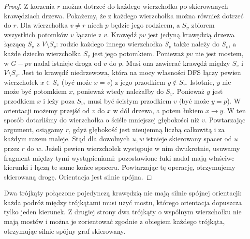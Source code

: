 \begin{proof}
Z korzenia $r$ można dotrzeć do każdego wierzchołka
po skierowanych krawędziach drzewa. Pokażemy, że
z każdego wierzchołka można również dotrzeć do $r$.
Dla wierzchołka $v\ne r$ niech $p$ będzie jego rodzicem,
a $S_v$ zbiorem wszystkich potomków $v$ łącznie z $v$.
Krawędź $pv$ jest jedyną krawędzią drzewa łączącą
$S_v$ z $V\setminus S_v$: rodzic każdego innego
wierzchołka $S_v$ także należy do $S_v$, a każde
dziecko wierzchołka $S_v$ jest jego potomkiem.
Ponieważ $pv$ nie jest mostem, w $G-pv$ nadal istnieje
droga od $v$ do $p$. Musi ona zawierać krawędź między
$S_v$ i $V\setminus S_v$. Jest to krawędź niedrzewowa,
która na mocy własności DFS łączy pewien wierzchołek
$x\in S_v$ (być może $x=v$) z jego przodkiem
$y\notin S_v$. Istotnie, $y$ nie może być potomkiem
$x$, ponieważ wtedy należałby do $S_v$. Ponieważ
$y$ jest przodkiem $x$ i leży poza $S_v$, musi być
ścisłym przodkiem $v$ (być może $y=p$).
W orientacji możemy przejść od $v$ do $x$ w dół drzewa,
a potem łukiem $x\to y$. W ten sposób dotarliśmy do
wierzchołka o ściśle mniejszej głębokości niż $v$.
Powtarzając argument, osiągamy $r$, gdyż głębokość
jest nieujemną liczbą całkowitą i za każdym razem maleje.
Stąd dla dowolnych $u,w$ istnieje skierowany spacer
od $u$ przez $r$ do $w$. Jeżeli pewien wierzchołek
występuje w nim dwukrotnie, usuwamy fragment między
tymi wystąpieniami: pozostawione łuki nadal mają
właściwe kierunki i łączą te same końce spaceru.
Powtarzając tę operację, otrzymujemy skierowaną drogę. Orientacja jest silnie spójna.
\end{proof}

\begin{przyklad}
Dwa trójkąty połączone pojedynczą krawędzią nie mają
silnie spójnej orientacji: każda podróż między trójkątami
musi użyć mostu, którego orientacja dopuszcza tylko jeden
kierunek. Z drugiej strony dwa trójkąty o wspólnym
wierzchołku nie mają mostów i można je zorientować
zgodnie z obiegiem każdego trójkąta, otrzymując
silnie spójny graf skierowany.
\end{przyklad}

\begin{center}
\end{center}

